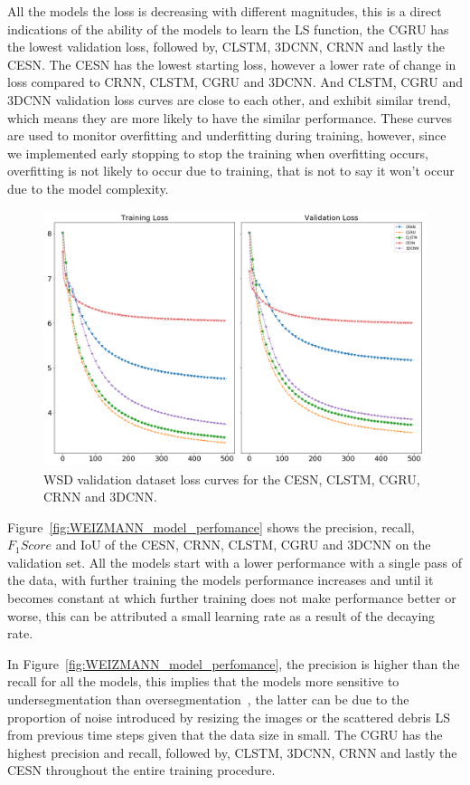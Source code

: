 \documentclass{WitsPhysicsReport}
\begin{document}
All the models the loss is decreasing with different magnitudes, this is a direct indications of the ability of the models to learn the LS function, the CGRU has the lowest validation loss, followed by, CLSTM, 3DCNN, CRNN and lastly the CESN. The CESN has the lowest starting loss, however a lower rate of change in loss compared to CRNN, CLSTM, CGRU and 3DCNN. And CLSTM, CGRU and 3DCNN validation loss curves are close to each other, and exhibit similar trend, which means they are more likely to have the similar performance. These curves are used to monitor overfitting and underfitting during training, however, since we implemented early stopping to stop the training when overfitting occurs, overfitting is not likely to occur due to training, that is not to say it won't occur due to the model complexity.

\begin{figure}[H]
\centering
  \includegraphics[width=1\textwidth]{Figure/Results/WEIZMANN_loss.png}
 \caption{WSD validation dataset loss curves for the CESN, CLSTM, CGRU, CRNN and 3DCNN.}
 \label{fig:WEIZMANN_model_loss}
\end{figure}


Figure~\ref{fig:WEIZMANN_model_perfomance} shows the precision, recall, $F_{1}Score$ and IoU of the CESN, CRNN, CLSTM, CGRU and 3DCNN on the validation set. All the models start with a lower performance with a single pass of the data, with further training the models performance increases and until it becomes constant at which further training does not make performance better or worse, this can be attributed a small learning rate as a result of the decaying rate.

In Figure~\ref{fig:WEIZMANN_model_perfomance}, the precision is higher than the recall for all the models, this implies that the models more sensitive to undersegmentation than oversegmentation~\cite{sigut2015over, troya2015unsupervised}, the latter can be due to the proportion of noise introduced by resizing the images or the scattered debris LS from previous time steps given that the data size in small. The CGRU has the highest precision and recall, followed by, CLSTM, 3DCNN, CRNN and lastly the CESN throughout the entire training procedure.
\end{document}
